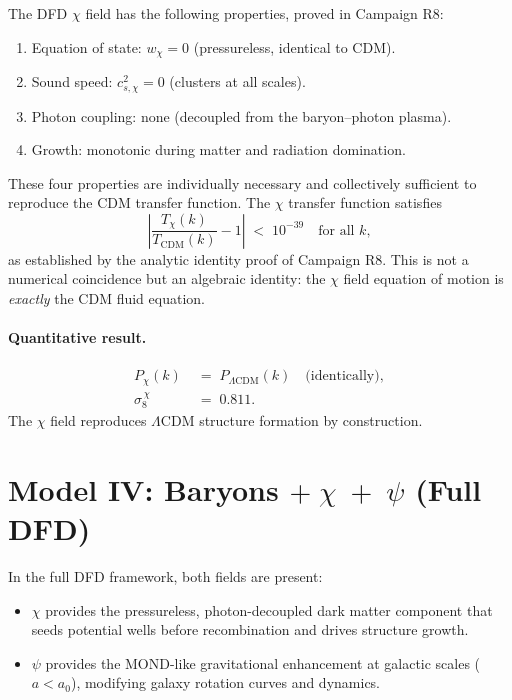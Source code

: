 \documentclass[12pt,a4paper]{article}
\newcommand{\LCDM}{\Lambda\mathrm{CDM}}
\newcommand{\azero}{a_0}
\begin{document}
The DFD $\chi$ field has the following properties, proved in Campaign R8:
\begin{enumerate}
  \item Equation of state: $w_\chi = 0$ (pressureless, identical to CDM).
  \item Sound speed: $c_{s,\chi}^2 = 0$ (clusters at all scales).
  \item Photon coupling: none (decoupled from the baryon--photon plasma).
  \item Growth: monotonic during matter and radiation domination.
\end{enumerate}

These four properties are individually necessary and collectively
sufficient to reproduce the CDM transfer function. The $\chi$ transfer
function satisfies
\begin{equation}
  \left|\frac{T_\chi(k)}{T_{\mathrm{CDM}}(k)} - 1\right|
  \;<\; 10^{-39}
  \quad\text{for all } k,
\end{equation}
as established by the analytic identity proof of Campaign R8. This is
not a numerical coincidence but an algebraic identity: the $\chi$
field equation of motion is \emph{exactly} the CDM fluid equation.

\paragraph{Quantitative result.}
\begin{align}
  P_\chi(k) &\;=\; P_{\LCDM}(k)
  \quad\text{(identically)}, \\
  \sigma_8^{\,\chi} &\;=\; 0.811.
\end{align}
The $\chi$ field reproduces $\LCDM$ structure formation by construction.

\section{Model IV: Baryons $+\;\chi\;+\;\psi$ (Full DFD)}
\label{sec:full_dfd}

In the full DFD framework, both fields are present:
\begin{itemize}
  \item $\chi$ provides the pressureless, photon-decoupled dark matter
    component that seeds potential wells before recombination and drives
    structure growth.
  \item $\psi$ provides the MOND-like gravitational enhancement at
    galactic scales ($a < \azero$), modifying galaxy rotation curves
    and dynamics.
\end{itemize}
\end{document}
